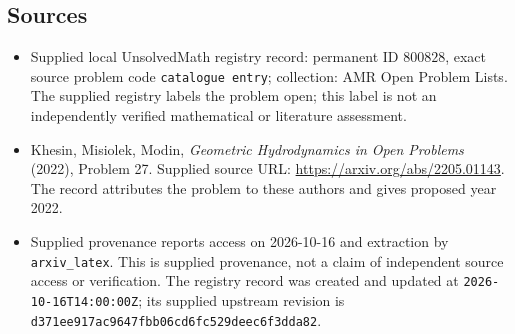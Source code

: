 \documentclass[11pt]{article}
\begin{document}
\subsection{Sources}
\begin{itemize}
\item Supplied local UnsolvedMath registry record: permanent ID \(800828\), exact source problem code \texttt{catalogue entry}; collection: AMR Open Problem Lists. The supplied registry labels the problem open; this label is not an independently verified mathematical or literature assessment.
\item Khesin, Misiolek, Modin, \emph{Geometric Hydrodynamics in Open Problems} (2022), Problem 27. Supplied source URL: \url{https://arxiv.org/abs/2205.01143}. The record attributes the problem to these authors and gives proposed year 2022.
\item Supplied provenance reports access on 2026-10-16 and extraction by \texttt{arxiv\_latex}. This is supplied provenance, not a claim of independent source access or verification. The registry record was created and updated at \texttt{2026-10-16T14:00:00Z}; its supplied upstream revision is \texttt{d371ee917ac9647fbb06cd6fc529deec6f3dda82}.
\end{itemize}
\end{document}
